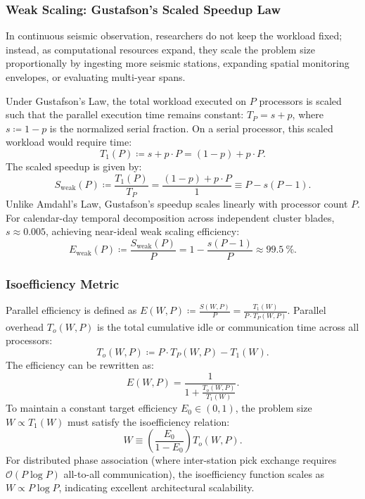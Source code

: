 \subsubsection*{Weak Scaling: Gustafson's Scaled Speedup Law}
In continuous seismic observation, researchers do not keep the
workload fixed; instead,
as computational resources expand, they scale the problem size
proportionally by ingesting
more seismic stations, expanding spatial monitoring envelopes, or
evaluating multi-year spans.

Under Gustafson's Law, the total workload executed on $P$ processors
is scaled such that the
parallel execution time remains constant: $T_P = s + p$, where $s
\coloneqq 1 - p$ is the
normalized serial fraction. On a serial processor, this scaled
workload would require time:
\begin{equation}
  T_1(P) \coloneqq s + p \cdot P = (1 - p) + p \cdot P.
  \label{eq:supp_gustafson_t1}
\end{equation}
The scaled speedup is given by:
\begin{equation}
  S_{\mathrm{weak}}(P) \coloneqq \frac{T_1(P)}{T_P} = \frac{(1 - p)
  + p \cdot P}{1} \equiv P - s(P - 1).
  \label{eq:supp_gustafson_law}
\end{equation}
Unlike Amdahl's Law, Gustafson's speedup scales linearly with
processor count $P$.
For calendar-day temporal decomposition across independent cluster
blades, $s \approx \num{0.005}$,
achieving near-ideal weak scaling efficiency:
\begin{equation}
  E_{\mathrm{weak}}(P) \coloneqq \frac{S_{\mathrm{weak}}(P)}{P} = 1
  - \frac{s(P - 1)}{P} \approx \qty{99.5}{\percent}.
  \label{eq:supp_weak_efficiency}
\end{equation}

\subsubsection*{Isoefficiency Metric}
Parallel efficiency is defined as $E(W, P) \coloneqq \frac{S(W,
P)}{P} = \frac{T_1(W)}{P \cdot T_P(W, P)}$.
Parallel overhead $T_o(W, P)$ is the total cumulative idle or
communication time across all processors:
\begin{equation}
  T_o(W, P) \coloneqq P \cdot T_P(W, P) - T_1(W).
  \label{eq:supp_overhead_def}
\end{equation}
The efficiency can be rewritten as:
\begin{equation}
  E(W, P) = \frac{1}{1 + \frac{T_o(W, P)}{T_1(W)}}.
  \label{eq:supp_efficiency_overhead}
\end{equation}
To maintain a constant target efficiency $E_0 \in (0, 1)$, the
problem size $W \propto T_1(W)$ must satisfy
the isoefficiency relation:
\begin{equation}
  W \equiv \left(\frac{E_0}{1 - E_0}\right) T_o(W, P).
  \label{eq:supp_isoefficiency}
\end{equation}
For distributed phase association (where inter-station pick exchange
  requires $\mathcal{O}(P \log P)$
all-to-all communication), the isoefficiency function scales as $W
\propto P \log P$, indicating
excellent architectural scalability.

